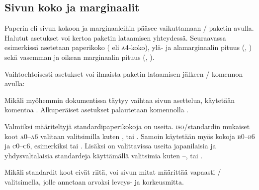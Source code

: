 \subsection{Sivun koko ja marginaalit}
\label{luku/sivun-mitat}

Paperin eli sivun kokoon ja marginaaleihin pääsee vaikuttamaan
\-/ paketin avulla. Halutut asetukset voi kertoa
paketin lataamisen yhteydessä. Seuraavassa esimerkissä asetetaan
paperikoko ( eli \textsc{a4}-koko), ylä- ja
alamarginaalin pituus (, ) sekä vasemman ja
oikean marginaalin pituus (, ).

\begin{koodilohkosis}
\usepackage[a4paper, top=20mm, bottom=30mm,
  left=20mm, right=20mm]{geometry}
\end{koodilohkosis}

\noindent
Vaihtoehtoisesti asetukset voi ilmaista paketin lataamisen jälkeen
\-/ komennon avulla:

\begin{koodilohkosis}
\geometry{a4paper, top=20mm, bottom=30mm, left=20mm, right=20mm}
\end{koodilohkosis}

\noindent
Mikäli myöhemmin dokumentissa täytyy vaihtaa sivun asettelua, käytetään
komentoa . Alkuperäiset asetukset palautetaan
komennolla .

\begin{koodilohkosis}
\restoregeometry     %
\end{koodilohkosis}

\noindent
Valmiiksi määriteltyjä standardipaperikokoja on useita.
\textsc{iso}\-/standardin mukaiset koot \textsc{a0}--\textsc{a6}
valitaan valitsimilla kuten ,  tai
. Samoin käytetään myös kokoja \textsc{b0}--\textsc{b6}
ja \textsc{c0}--\textsc{c6}, esimerkiksi  tai
. Lisäksi on valittavissa useita japanilaisia ja
yhdysvaltalaisia standardeja käyttämällä valitsimia kuten
--,  tai
.

Mikäli standardit koot eivät riitä, voi sivun mitat määrittää vapaasti
\-/ valitsimella, jolle annetaan arvoksi leveys- ja
korkeusmitta.

